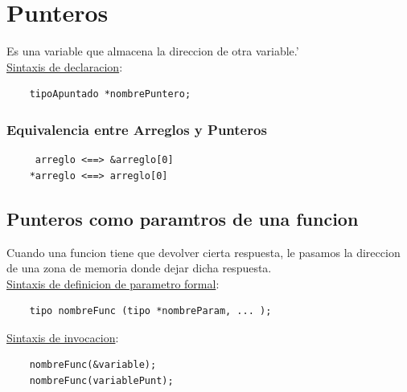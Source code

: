 \documentclass{article}
\begin{document}
\newpage
\section{Punteros}
Es una variable que almacena la direccion de otra variable.'
\\\underline{Sintaxis de declaracion}:
\begin{lstlisting}
    tipoApuntado *nombrePuntero;
\end{lstlisting}
\subsubsection*{Equivalencia entre Arreglos y Punteros}
\begin{lstlisting}
     arreglo <==> &arreglo[0]
    *arreglo <==> arreglo[0]
\end{lstlisting}

\subsection{Punteros como paramtros de una funcion}
Cuando una funcion tiene que devolver cierta respuesta, le pasamos la direccion de una zona de memoria
donde dejar dicha respuesta.
\\\underline{Sintaxis de definicion de parametro formal}:
\begin{lstlisting}
    tipo nombreFunc (tipo *nombreParam, ... );
\end{lstlisting}
\underline{Sintaxis de invocacion}:
\begin{lstlisting}
    nombreFunc(&variable);
    nombreFunc(variablePunt);
\end{lstlisting}
\end{document}
